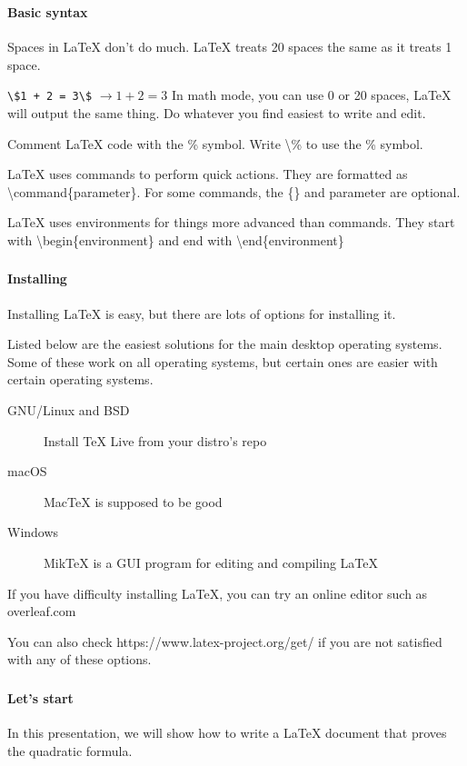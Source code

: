 \documentclass{beamer}
\begin{document}
	\begin{frame}
		\frametitle{\secname}
		\framesubtitle{Basic syntax}
		\begin{description}[<+->]
			\item[Spacing] Spaces in \LaTeX{} don't do much. \LaTeX{} treats 20 spaces the same as it treats 1 space.
			\item[Inline math] \lstinline{\$1 + 2 = 3\$} $\rightarrow 1 + 2 = 3$ In math mode, you can use 0 or 20 spaces, \LaTeX{} will output the same thing. Do whatever you find easiest to write and edit.
			\item[Comments] Comment \LaTeX{} code with the \% symbol. Write \textbackslash\% to use the \% symbol.
			\item[Commands] \LaTeX{} uses commands to perform quick actions. They are formatted as \textbackslash command\{parameter\}. For some commands, the \{\} and parameter are optional.
			\item[Environments] \LaTeX{} uses environments for things more advanced than commands. They start with \textbackslash begin\{environment\} and end with \textbackslash end\{environment\}
		\end{description}
	\end{frame}
	\begin{frame}
		\frametitle{\secname}
		\framesubtitle{Installing}
		Installing \LaTeX{} is easy, but there are lots of options for installing it.
		
		Listed below are the easiest solutions for the main desktop operating systems. Some of these work on all operating systems, but certain ones are easier with certain operating systems.
		\begin{description}
			\item[GNU/Linux and BSD] Install \TeX{} Live from your distro's repo
			\item[macOS] Mac\TeX{} is supposed to be good
			\item[Windows] MikTeX is a GUI program for editing and compiling \LaTeX{}
		\end{description}
		If you have difficulty installing \LaTeX{}, you can try an online editor such as overleaf.com

		You can also check https://www.latex-project.org/get/ if you are not satisfied with any of these options.
	\end{frame}
	\begin{frame}
		\frametitle{\secname}
		\framesubtitle{Let's start}
		In this presentation, we will show how to write a \LaTeX{} document that proves the quadratic formula.
	\end{frame}
\end{document}
